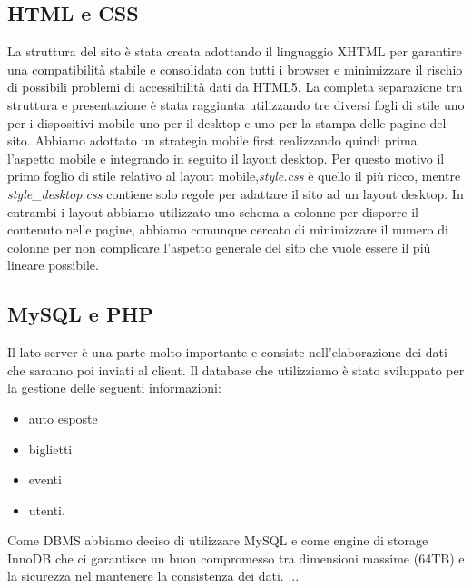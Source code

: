 \subsection{HTML e CSS}
La struttura del sito è stata creata adottando il linguaggio XHTML per garantire una compatibilità stabile e consolidata con tutti i browser e minimizzare il rischio di possibili problemi di accessibilità dati da HTML5.
La completa separazione tra struttura e presentazione è stata raggiunta utilizzando tre diversi fogli di stile uno per i dispositivi mobile uno per il desktop e uno per la stampa delle pagine del sito. Abbiamo adottato un strategia mobile first realizzando quindi prima l'aspetto mobile e integrando in seguito il layout desktop. Per questo motivo il primo foglio di stile relativo al layout mobile,\textit{style.css} è quello il più ricco, mentre \textit{style\_desktop.css} contiene solo regole per adattare il sito ad un layout desktop. In entrambi i layout abbiamo utilizzato uno schema a colonne per disporre il contenuto nelle pagine, abbiamo comunque cercato di minimizzare il numero di colonne per non complicare l'aspetto generale del sito che vuole essere il più lineare possibile.

\subsection{MySQL e PHP}
	Il lato server è una parte molto importante e consiste nell'elaborazione dei dati che saranno poi inviati al
	client. Il database che utilizziamo è stato sviluppato per la gestione delle seguenti informazioni:
	\begin{itemize}
		\item auto esposte 
		\item biglietti
		\item eventi
		\item utenti.
	\end{itemize}
	Come DBMS abbiamo deciso di utilizzare MySQL e come engine di storage InnoDB che
	ci garantisce un buon compromesso
	tra dimensioni massime (64TB) e la sicurezza nel mantenere la consistenza dei dati. 
	...
